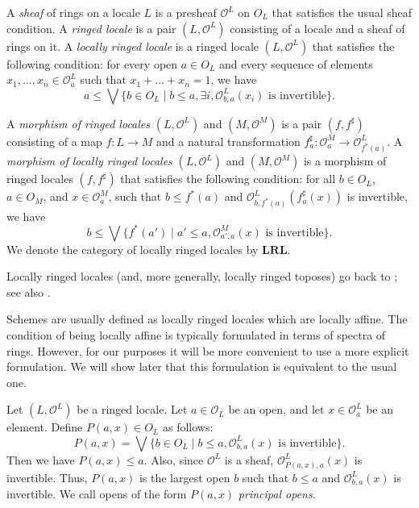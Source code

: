 \documentclass[reqno]{amsart}
\theoremstyle{definition}
\theoremstyle{remark}
\numberwithin{figure}{section}
\newcommand{\cat}[1]{\mathbf{#1}}
\begin{document}
A \emph{sheaf} of rings on a locale $L$ is a presheaf $\mathcal{O}^L$ on $O_L$ that satisfies the usual sheaf condition.
A \emph{ringed locale} is a pair $(L,\mathcal{O}^L)$ consisting of a locale and a sheaf of rings on it.
A \emph{locally ringed locale} is a ringed locale $(L,\mathcal{O}^L)$ that satisfies the following condition:
for every open $a \in O_L$ and every sequence of elements $x_1, \ldots, x_n \in \mathcal{O}^L_a$ such that $x_1 + \ldots + x_n = 1$, we have
\[ a \leq \bigvee \{ b \in O_L \mid b \leq a, \exists i, \mathcal{O}^L_{b,a}(x_i) \text{ is invertible} \}. \]

\begin{defn}
A \emph{morphism of ringed locales} $(L,\mathcal{O}^L)$ and $(M,\mathcal{O}^M)$ is a pair $(f,f^\sharp)$ consisting of a map $f : L \to M$ and a natural transformation $f^\sharp_a : \mathcal{O}^M_a \to \mathcal{O}^L_{f^*(a)}$.
A \emph{morphism of locally ringed locales} $(L,\mathcal{O}^L)$ and $(M,\mathcal{O}^M)$ is a morphism of ringed locales $(f,f^\sharp)$ that satisfies the following condition:
for all $b \in O_L$, $a \in O_M$, and $x \in \mathcal{O}^M_a$, such that $b \leq f^*(a)$ and $\mathcal{O}^L_{b,f^*(a)}(f^\sharp_a(x))$ is invertible, we have
\[ b \leq \bigvee \{ f^*(a') \mid a' \leq a, \mathcal{O}^M_{a',a}(x) \text{ is invertible} \}. \]
We denote the category of locally ringed locales by $\cat{LRL}$.
\end{defn}

Locally ringed locales (and, more generally, locally ringed toposes) go back to \cite{hakim}; see also \cite{blechschmidt}.

Schemes are usually defined as locally ringed locales which are locally affine.
The condition of being locally affine is typically formulated in terms of spectra of rings.
However, for our purposes it will be more convenient to use a more explicit formulation.
We will show later that this formulation is equivalent to the usual one.

Let $(L,\mathcal{O}^L)$ be a ringed locale.
Let $a \in \mathcal{O}_L$ be an open, and let $x \in \mathcal{O}^L_a$ be an element.
Define $P(a,x) \in O_L$ as follows:
\[ P(a,x) = \bigvee \{ b \in O_L \mid b \leq a, \mathcal{O}^L_{b,a}(x) \text{ is invertible} \}. \]
Then we have $P(a,x) \leq a$.
Also, since $\mathcal{O}^L$ is a sheaf, $\mathcal{O}^L_{P(a,x),a}(x)$ is invertible.
Thus, $P(a,x)$ is the largest open $b$ such that $b \leq a$ and $\mathcal{O}^L_{b,a}(x)$ is invertible.
We call opens of the form $P(a,x)$ \emph{principal opens}.
\end{document}
